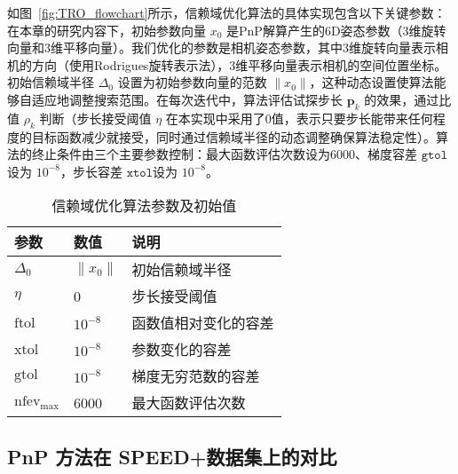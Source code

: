 如图~\ref{fig:TRO_flowchart}所示，信赖域优化算法的具体实现包含以下关键参数：在本章的研究内容下，初始参数向量 $x_0$ 是PnP解算产生的6D姿态参数（3维旋转向量和3维平移向量）。我们优化的参数是相机姿态参数，其中3维旋转向量表示相机的方向（使用Rodrigues旋转表示法），3维平移向量表示相机的空间位置坐标。初始信赖域半径 $\Delta_0$ 设置为初始参数向量的范数 $\|x_0\|$，这种动态设置使算法能够自适应地调整搜索范围。在每次迭代中，算法评估试探步长 $\mathbf{p}_k$ 的效果，通过比值 $\rho_k$ 判断（步长接受阈值 $\eta$ 在本实现中采用了0值，表示只要步长能带来任何程度的目标函数减少就接受，同时通过信赖域半径的动态调整确保算法稳定性）。算法的终止条件由三个主要参数控制：最大函数评估次数设为6000、梯度容差 $\texttt{gtol}$设为 $10^{-8}$，步长容差 $\texttt{xtol}$设为 $10^{-8}$。
\begin{table}[htbp]
	\centering
	\caption{信赖域优化算法参数及初始值}
	\label{tab:tr_parameters}
	\begin{tabular}{llp{8cm}}
		\hline
		参数 & 数值 & 说明 \\
		\hline
		$\Delta_0$ & $\|x_0\|$ & 初始信赖域半径\\
		$\eta$ & 0 & 步长接受阈值 \\
		$\text{ftol}$ & $10^{-8}$ & 函数值相对变化的容差 \\
		$\text{xtol}$ & $10^{-8}$ & 参数变化的容差 \\
		$\text{gtol}$ & $10^{-8}$ & 梯度无穷范数的容差 \\
		$\text{nfev}_\text{max}$ & 6000 & 最大函数评估次数 \\
		\hline
	\end{tabular}
\end{table}


\subsection{PnP 方法在 SPEED+数据集上的对比}
\begin{table}[!htbp]
	\centering
	\caption{在SPEED+合成数据集上的PnP算法对比}
	\label{tab:PnPCmp}
\end{table}

